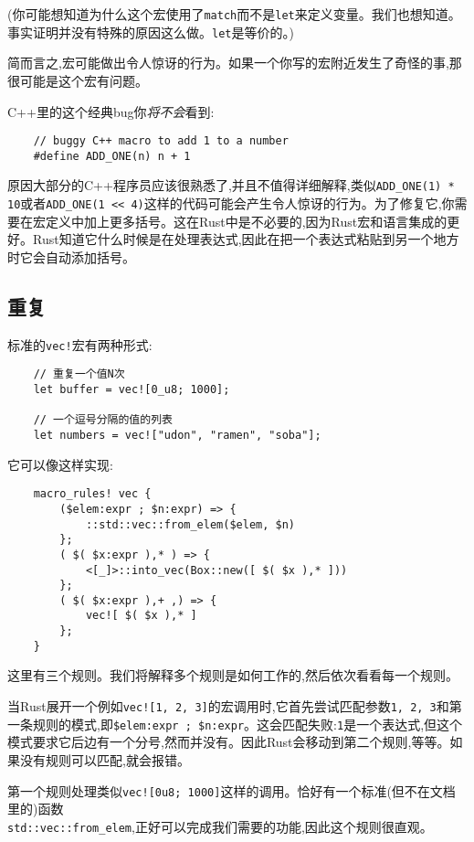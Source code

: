 (你可能想知道为什么这个宏使用了\texttt{match}而不是\texttt{let}来定义变量。我们也想知道。事实证明并没有特殊的原因这么做。\texttt{let}是等价的。)

简而言之,宏可能做出令人惊讶的行为。如果一个你写的宏附近发生了奇怪的事,那很可能是这个宏有问题。

C++里的这个经典bug你\emph{将不会}看到:
\begin{verbatim}
    // buggy C++ macro to add 1 to a number
    #define ADD_ONE(n) n + 1
\end{verbatim}

原因大部分的C++程序员应该很熟悉了,并且不值得详细解释,类似\texttt{ADD\_ONE(1) * 10}或者\texttt{ADD\_ONE(1 << 4)}这样的代码可能会产生令人惊讶的行为。为了修复它,你需要在宏定义中加上更多括号。这在Rust中是不必要的,因为Rust宏和语言集成的更好。Rust知道它什么时候是在处理表达式,因此在把一个表达式粘贴到另一个地方时它会自动添加括号。

\subsection{重复}
标准的\texttt{vec!}宏有两种形式:
\begin{verbatim}
    // 重复一个值N次
    let buffer = vec![0_u8; 1000];

    // 一个逗号分隔的值的列表
    let numbers = vec!["udon", "ramen", "soba"];
\end{verbatim}

它可以像这样实现:
\begin{verbatim}
    macro_rules! vec {
        ($elem:expr ; $n:expr) => {
            ::std::vec::from_elem($elem, $n)
        };
        ( $( $x:expr ),* ) => {
            <[_]>::into_vec(Box::new([ $( $x ),* ]))
        };
        ( $( $x:expr ),+ ,) => {
            vec![ $( $x ),* ]
        };
    }
\end{verbatim}

这里有三个规则。我们将解释多个规则是如何工作的,然后依次看看每一个规则。

当Rust展开一个例如\texttt{vec![1, 2, 3]}的宏调用时,它首先尝试匹配参数\texttt{1, 2, 3}和第一条规则的模式,即\texttt{\$elem:expr ; \$n:expr}。这会匹配失败:\texttt{1}是一个表达式,但这个模式要求它后边有一个分号,然而并没有。因此Rust会移动到第二个规则,等等。如果没有规则可以匹配,就会报错。

第一个规则处理类似\texttt{vec![0u8; 1000]}这样的调用。恰好有一个标准(但不在文档里的)函数\\
\texttt{std::vec::from\_elem},正好可以完成我们需要的功能,因此这个规则很直观。

